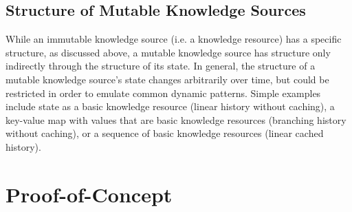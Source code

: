\documentclass[runningheads]{llncs}
\begin{document}
\subsection{Structure of Mutable Knowledge Sources}
While an immutable knowledge source (i.e. a knowledge resource) has a specific structure, as discussed above, a mutable knowledge source has structure only indirectly through the structure of its state. In general, the structure of a mutable knowledge source's state changes arbitrarily over time, but could be restricted in order to emulate common dynamic patterns. Simple examples include state as a basic knowledge resource (linear history without caching), a key-value map with values that are basic knowledge resources (branching history without caching), or a sequence of basic knowledge resources (linear cached history). 



\section{Proof-of-Concept}
\end{document}
